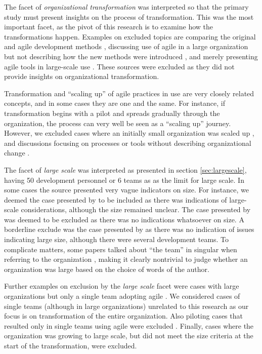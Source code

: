 The facet of \emph{organizational transformation} was interpreted so that the
primary study must present insights on the process of transformation. This
was the most important facet, as the pivot of this research is to examine
how the transformations happen. Examples on excluded topics are comparing the
original and agile development methods \citep{Petersen2010}, discussing use of
agile in a large organization but not describing how the new methods were
introduced \citep{Mishra2011}, and merely presenting agile tools in large-scale
use \citep{Kim2012}. These sources were excluded as they did not provide insights
on organizational transformation.

Transformation and ``scaling up'' of agile practices in use are very closely
related concepts, and in some cases they are one and the same. For instance, if
transformation begins with a pilot and spreads gradually through the
organization, the process can very well be seen as a ``scaling up'' journey.
However, we excluded cases where an initially small organization was scaled up
\citep{Maranzato2012}, and discussions focusing on processes or tools without
describing organizational change \citep{Lyon2008}.

The facet of \emph{large scale} was interpreted as presented in section
\ref{sec:largescale}, having 50 development personnel or 6 teams as as the limit
for large scale. In some cases the source presented very vague indicators on
size. For instance, we deemed the case presented by \citet{Cloke2007} to be
included as there was indications of large-scale considerations, although the
size remained unclear. The case presented by \citet{Miller2012} was deemed to be
excluded as there was no indications whatsoever on size. A borderline exclude
was the case presented by \citet{Tudor2006} as there was no indication of issues
indicating large size, although there were several development teams.
To complicate matters, some papers talked about ``the team'' in singular when
referring to the organization \citep{Hodgkins2007}, making it clearly nontrivial
to judge whether an organization was large based on the choice of words of the
author.

Further examples on exclusion by the \emph{large scale} facet were cases with
large organizations but only a single team adopting agile \citep{Fulgham2011}.
We considered cases of single teams (although in large organizations) unrelated
to this research as our focus is on transformation of the entire organization.
Also piloting cases that resulted only in single teams using agile were excluded
\citep{Scott2008}. Finally, cases where the organization was growing to large
scale, but did not meet the size criteria at the start of the transformation,
were excluded.

